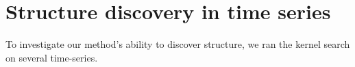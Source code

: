 
\section{Structure discovery in time series}
\label{sec:time_series}


To investigate our method's ability to discover structure, we ran the kernel search on several time-series.

